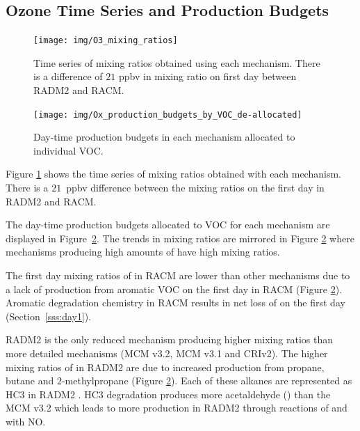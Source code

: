 %
\subsection[O3 Time Series and Ox Production Budgets]{Ozone Time Series and  Production Budgets} \label{ss:O3_time_series}
%
\begin{figure}
    \centering
    \texttt{[image: img/O3\_mixing\_ratios]}
    \vspace{0mm}
    \caption{Time series of  mixing ratios obtained using each mechanism. There is a difference of $21$ ppbv in  mixing ratio on first day between RADM2 and RACM.}
    \vspace{-4mm}
    \label{f:time_series}
\end{figure}
%
\begin{figure}
    \centering
    \texttt{[image: img/Ox\_production\_budgets\_by\_VOC\_de-allocated]}
    \vspace{1mm}
    \caption{Day-time  production budgets in each mechanism allocated to individual VOC.}
    \vspace{-4mm}
    \label{f:Ox_tagged_budgets}
\end{figure}
%
Figure \ref{f:time_series} shows the time series of  mixing ratios obtained with each mechanism.
There is a \mbox{$21$ ppbv} difference between the  mixing ratios on the first day in RADM2 and RACM.

The day-time  production budgets allocated to VOC for each mechanism are displayed in \mbox{Figure \ref{f:Ox_tagged_budgets}}.
The trends in  mixing ratios are mirrored in Figure \ref{f:Ox_tagged_budgets} where mechanisms producing high amounts of  have high  mixing ratios.

The first day mixing ratios of  in RACM are lower than other mechanisms due to a lack of  production from aromatic VOC on the first day in RACM (Figure \ref{f:Ox_tagged_budgets}).
Aromatic degradation chemistry in RACM results in net loss of  on the first day (\mbox{Section \ref{sss:day1}}).

RADM2 is the only reduced mechanism producing higher  mixing ratios than more detailed mechanisms (MCM v3.2, MCM v3.1 and CRIv2).
The higher mixing ratios of  in RADM2 are due to increased  production from propane, butane and $2$-methylpropane (Figure \ref{f:Ox_tagged_budgets}).
Each of these alkanes are represented as HC3 in RADM2 \citep{Stockwell:1990}.
HC3 degradation produces more acetaldehyde () than the MCM v3.2 which leads to more  production in RADM2 through reactions of  and  with NO. 
%
